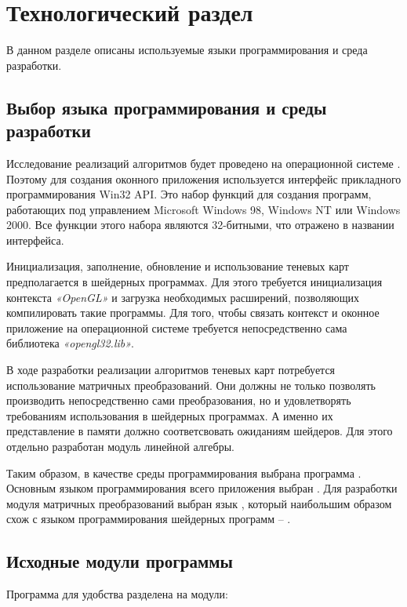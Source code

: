 \chapter{Технологический раздел}

В данном разделе описаны используемые языки программирования и среда
разработки.

\section{Выбор языка программирования и среды разработки}

Исследование реализаций алгоритмов будет проведено на операционной системе
. Поэтому для создания оконного приложения используется
интерфейс прикладного программирования Win32 API. Это набор функций
для создания программ, работающих под управлением Microsoft Windows 98,
Windows NT или Windows 2000. Все функции этого набора являются 32-битными,
что отражено в названии интерфейса.~\cite{Win32Api_Shupak}

Инициализация, заполнение, обновление и использование теневых карт
предполагается в шейдерных программах. Для этого требуется инициализация
контекста \textit{«OpenGL»} и загрузка необходимых расширений, 
позволяющих компилировать такие программы. Для того,
чтобы связать контекст и оконное приложение на операционной системе
 требуется непосредственно сама библиотека
\textit{«opengl32.lib»}.~\cite{extOpenGL}

В ходе разработки реализации алгоритмов теневых карт потребуется
использование матричных преобразований. Они должны не только позволять
производить непосредственно сами преобразования, но и удовлетворять
требованиям использования в шейдерных программах. А именно их представление
в памяти должно соответсвовать ожиданиям шейдеров. Для этого отдельно
разработан модуль линейной алгебры.~\cite{Linal}

Таким образом, в качестве среды программирования выбрана программа
. Основным языком программирования всего приложения
выбран . Для разработки модуля матричных преобразований выбран язык
, который наибольшим образом схож с языком программирования шейдерных
программ -- .

\section{Исходные модули программы}

Программа для удобства разделена на модули:

